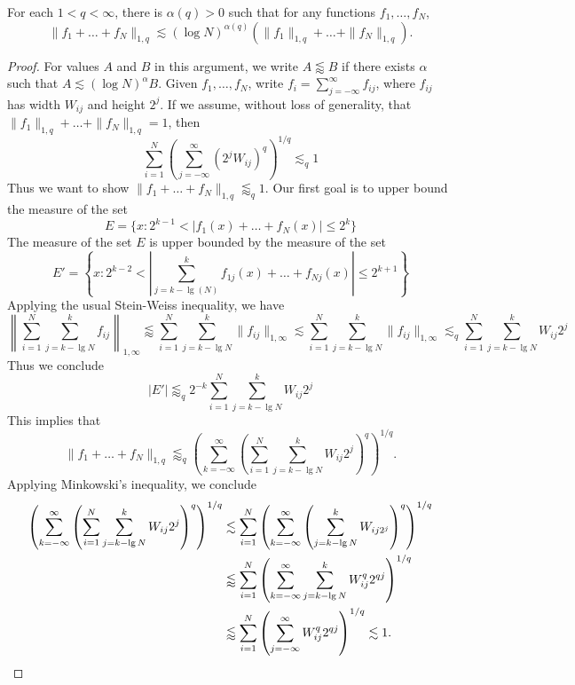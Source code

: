 \begin{theorem}
	For each $1 < q < \infty$, there is $\alpha(q) > 0$ such that for any functions $f_1, \dots, f_N$,
	\[ \| f_1 + \dots + f_N \|_{1,q} \lesssim (\log N)^{\alpha(q)} \left( \| f_1 \|_{1,q} + \dots + \| f_N \|_{1,q} \right). \]
\end{theorem}
\begin{proof}
	For values $A$ and $B$ in this argument, we write $A \lessapprox B$ if there exists $\alpha$ such that $A \lesssim (\log N)^\alpha B$. Given $f_1, \dots, f_N$, write $f_i = \sum_{j = -\infty}^\infty f_{ij}$, where $f_{ij}$ has width $W_{ij}$ and height $2^j$. If we assume, without loss of generality, that $\| f_1 \|_{1,q} + \dots + \| f_N \|_{1,q} = 1$, then
	\[ \sum_{i = 1}^N \left( \sum_{j = -\infty}^\infty (2^j W_{ij})^q \right)^{1/q} \lesssim_q 1 \]
	Thus we want to show $\| f_1 + \dots + f_N \|_{1,q} \lessapprox_q 1$. Our first goal is to upper bound the measure of the set
	\[ E = \{ x: 2^{k-1} < |f_1(x) + \dots + f_N(x)| \leq 2^k  \} \]
	The measure of the set $E$ is upper bounded by the measure of the set
	\[ E' = \left\{ x: 2^{k-2} < \left|\sum_{j = k - \lg(N)}^k f_{1j}(x) + \dots + f_{Nj}(x) \right| \leq 2^{k+1} \right\} \]
	Applying the usual Stein-Weiss inequality, we have
	\[ \left\| \sum_{i = 1}^N \sum_{j = k - \lg N}^k f_{ij} \right\|_{1,\infty} \lessapprox \sum_{i = 1}^N \sum_{j = k - \lg N}^k \| f_{ij} \|_{1,\infty} \lesssim \sum_{i = 1}^N \sum_{j = k - \lg N}^k \| f_{ij} \|_{1,\infty} \lesssim_q \sum_{i = 1}^N \sum_{j = k - \lg N}^k W_{ij} 2^j \]
	Thus we conclude
	\[ |E'| \lessapprox_q 2^{-k} \sum_{i = 1}^N \sum_{j = k - \lg N}^k W_{ij} 2^j \]
	This implies that
	\[ \| f_1 + \dots + f_N \|_{1,q} \lessapprox_q \left( \sum_{k = -\infty}^\infty \left( \sum_{i = 1}^N \sum_{j = k - \lg N}^k W_{ij} 2^j \right)^q \right)^{1/q}. \]
	Applying Minkowski's inequality, we conclude
	\begin{align*}
		\left( \sum_{k = -\infty}^\infty \left( \sum_{i = 1}^N \sum_{j = k - \lg N}^k W_{ij} 2^j \right)^q \right)^{1/q} &\lesssim \sum_{i = 1}^N \left( \sum_{k = -\infty}^\infty \left( \sum_{j = k - \lg N}^k W_{ij 2^j} \right)^q \right)^{1/q}\\
		&\lessapprox \sum_{i = 1}^N \left( \sum_{k = -\infty}^\infty \sum_{j = k - \lg N}^k W_{ij}^q 2^{qj} \right)^{1/q}\\
		&\lessapprox \sum_{i = 1}^N \left( \sum_{j = -\infty}^\infty W_{ij}^q 2^{qj} \right)^{1/q} \lesssim 1. \qedhere
	\end{align*}
\end{proof}

